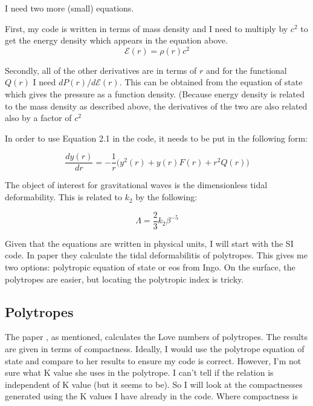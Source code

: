 \documentclass[11pt]{article}
\numberwithin{equation}{section}
\begin{document}
I need two more (small) equations.

First, my code is written in terms of mass density and I need to multiply by $c^2$ to get the energy density which appears in the equation above.  
\begin{equation}
\mathcal{E}(r) = \rho (r) c^{2}
\end{equation}

Secondly, all of the other derivatives are in terms of $r$ and for the functional $Q(r)$ I need $dP(r)/d\mathcal{E}(r)$.  This can be obtained from the equation of state which gives the pressure as a function density.  (Because energy density is related to the mass density as described above, the derivatives of the two are also related also by a factor of $c^{2}$


In order to use Equation 2.1 in the code, it needs to be put in the following form:


\begin{equation}
\frac{dy(r)}{dr} = - \frac{1}{r} \bigg( y^{2}(r) + y(r) F(r) + r^{2} Q(r)  \bigg)
\end{equation}

The object of interest for gravitational waves is the dimensionless tidal deformability.  This is related to $k_2$ by the following:

\begin{equation}
\Lambda = \frac{2}{3} k_{2} \beta^{-5}
\end{equation}


Given that the equations are written in physical units, I will start with the SI code.  In paper \cite{Hinderer_2008} they calculate the tidal deformabilitis of polytropes.  This gives me two options: polytropic equation of state or eos from Ingo.  On the surface, the polytropes are easier, but locating the polytropic index is tricky.  





\subsection{Polytropes}

The paper \cite{Hinderer_2008}, as mentioned, calculates the Love numbers of polytropes.  The results are given in terms of compactness.  Ideally, I would use the polytrope equation of state and compare to her results to ensure my code is correct.  However, I'm not sure what K value she uses in the polytrope.  I can't tell if the relation is independent of K value (but it seems to be).  So I will look at the compactnesses generated using the K values I have already in the code.  Where compactness is 
\end{document}
